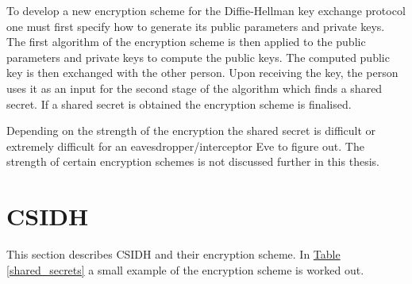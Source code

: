 \documentclass[openany, a4paper, 10pt]{book}
\theoremstyle{plain}
\theoremstyle{plain}
\theoremstyle{plain}
\theoremstyle{definition}
\theoremstyle{plain}
\theoremstyle{definition}
\theoremstyle{remark}
\newcommand{\tabref}[1]{\hyperref[#1]{Table \ref{#1}}}
\begin{document}
To develop a new encryption scheme for the Diffie-Hellman key exchange protocol one must first specify how to generate its public parameters and private keys.
The first algorithm of the encryption scheme is then applied to the public parameters and private keys to compute the public keys.
The computed public key is then exchanged with the other person.
Upon receiving the key, the person uses it as an input for the second stage of the algorithm which finds a shared secret.
If a shared secret is obtained the encryption scheme is finalised.

Depending on the strength of the encryption the shared secret is difficult or extremely difficult for an eavesdropper/interceptor Eve to figure out.
The strength of certain encryption schemes is not discussed further in this thesis.


\section{CSIDH}\label{sec:CSIDH}
This section describes CSIDH \cite{CSIDH} and their encryption scheme.
In \tabref{shared_secrets} a small example of the encryption scheme is worked out.
\end{document}
